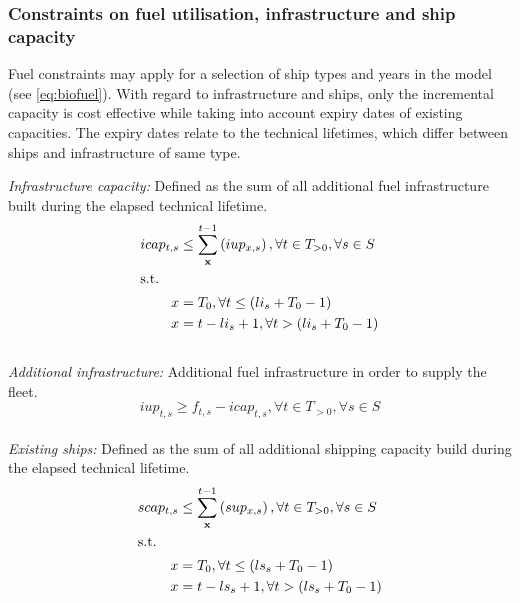 \documentclass[article]{elsarticle}
\begin{document}
\subsubsection{Constraints on fuel utilisation, infrastructure and ship capacity}
Fuel constraints may apply for a selection of ship types and years in the model (see \autoref{eq:biofuel}). With regard to infrastructure and ships, only the incremental capacity is cost effective while taking into account expiry dates of existing capacities. The expiry dates relate to the technical lifetimes, which differ between ships and infrastructure of same type.\\\par\noindent
\textit{Infrastructure capacity: }Defined as the sum of all additional fuel infrastructure built during the elapsed technical lifetime.
\begin{subequations}
    \begin{align}
        icap_{t,s} &\leq \sum_{\textbf{x}}^{t-1} \left( iup_{x,s} \right), \forall t \in T_{>0}, \forall s \in S\label{eq:icap}\\
        \intertext{s.t.}
        x &= T_0, \forall t \leq \left(li_{s} + T_0 - 1\right)\\
        x &= t - li_{s} + 1, \forall t > \left(li_{s} + T_0 - 1\right)
    \end{align}
\end{subequations}\\
\textit{Additional infrastructure: }Additional fuel infrastructure in order to supply the fleet.
\begin{equation}
    iup_{t,s} \geq f_{t,s} - icap_{t,s}, \forall t \in T_{>0}, \forall s \in S\label{eq:iup}
\end{equation}\\
\textit{Existing ships: }Defined as the sum of all additional shipping capacity build during the elapsed technical lifetime.
\begin{subequations}
    \begin{align}
        scap_{t,s} &\leq \sum_{\textbf{x}}^{t-1} \left(sup_{x,s} \right), \forall t \in T_{>0}, \forall s \in S\label{eq:scap}\\
        \intertext{s.t.}
        x &= T_0, \forall t \leq \left(ls_{s} + T_0 - 1\right)\\
        x &= t - ls_{s} + 1, \forall t > \left(ls_{s} + T_0 - 1\right)
    \end{align}
\end{subequations}\\
\end{document}
